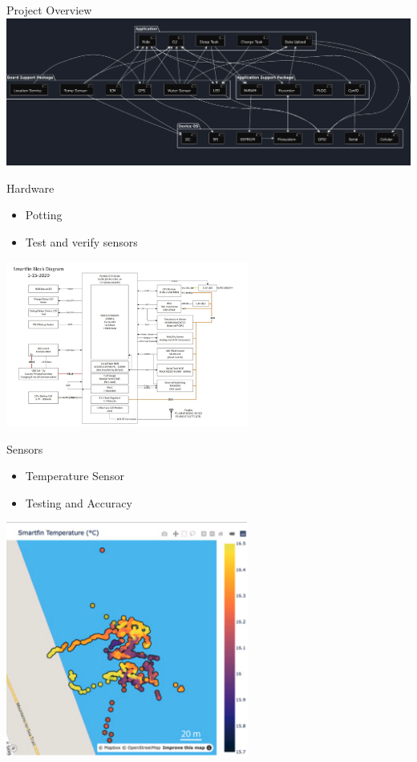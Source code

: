 \begin{frame}{Project Overview}
    \centering
    \includegraphics[height=1\textheight, width=1\textwidth, keepaspectratio]{images/sfSysArch.png}
\end{frame}

\begin{frame}{Hardware}
    \begin{itemize}
        \item Potting 
        \item Test and verify sensors
    \end{itemize}
    \centering    
    \includegraphics[height=0.6\textheight, width=0.6\textwidth, keepaspectratio]{images/schem.png}
\end{frame}

\begin{frame}{Sensors}
    \begin{itemize}
        \item Temperature Sensor
        \item Testing and Accuracy
    \end{itemize}
    \centering    
    \includegraphics[height=0.6\textheight, width=0.6\textwidth, keepaspectratio]{images/Smartfin_temp.png}
\end{frame}

